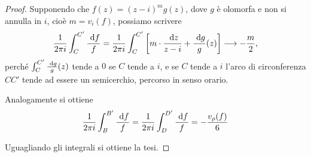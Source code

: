 \begin{proof}
	Supponendo che $f(z)=(z-i)^mg(z)$, dove $g$ è olomorfa e non si annulla in $i$, cioè $m=v_i(f)$, possiamo scrivere
	\begin{equation}
		\frac{1}{2\pi i}\int_C^{C'}\frac{\de f}{f} = \frac{1}{2\pi i}\int_C^{C'}\left[ m\cdot\frac{\de z}{z-i} + %
		\frac{\de g}{g}(z) \right] \longrightarrow -\frac{m}{2},
	\end{equation}
	perché $\int_C^{C'}\frac{\text{ d} g}{g}(z)$ tende a $0$ se $C$ tende a $i$, e se $C$ tende a $i$
	l'arco di circonferenza $CC'$ tende ad essere un semicerchio, percorso in senso orario.
	
	Analogamente si ottiene 
	\begin{equation}
		\frac{1}{2\pi i}\int_B^{B'}\frac{\text{ d} f}{f}=\frac{1}{2\pi i}\int_D^{D'}\frac{\text{ d} f}{f}=-\frac{v_\rho(f)}{6}
	\end{equation}
	
	Uguagliando gli integrali si ottiene la tesi.
\end{proof}
